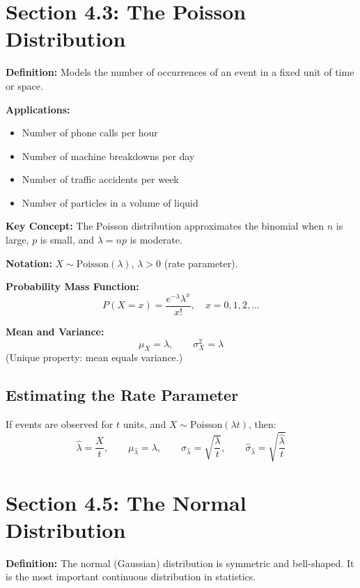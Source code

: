 \documentclass[11pt]{article}
\begin{document}
\section*{Section 4.3: The Poisson Distribution}
\textbf{Definition:} Models the number of occurrences of an event in a fixed unit of time or space.

\textbf{Applications:}
\begin{itemize}[nosep]
    \item Number of phone calls per hour
    \item Number of machine breakdowns per day
    \item Number of traffic accidents per week
    \item Number of particles in a volume of liquid
\end{itemize}

\textbf{Key Concept:} The Poisson distribution approximates the binomial when \(n\) is large, \(p\) is small, and \(\lambda = np\) is moderate.

\textbf{Notation:} \(X \sim \text{Poisson}(\lambda)\), \(\lambda > 0\) (rate parameter).

\textbf{Probability Mass Function:}
\[
P(X=x) = \frac{e^{-\lambda}\lambda^x}{x!},\quad x=0,1,2,\dots
\]

\textbf{Mean and Variance:}
\[
\mu_X = \lambda,\qquad \sigma_X^2 = \lambda
\]
(Unique property: mean equals variance.)

\subsection*{Estimating the Rate Parameter}
If events are observed for \(t\) units, and \(X \sim \text{Poisson}(\lambda t)\), then:
\[
\hat{\lambda} = \frac{X}{t},\qquad \mu_{\hat{\lambda}} = \lambda,\qquad \sigma_{\hat{\lambda}} = \sqrt{\frac{\lambda}{t}},\qquad \hat{\sigma}_{\hat{\lambda}} = \sqrt{\frac{\hat{\lambda}}{t}}
\]

\section*{Section 4.5: The Normal Distribution}
\textbf{Definition:} The normal (Gaussian) distribution is symmetric and bell-shaped. It is the most important continuous distribution in statistics.
\end{document}
